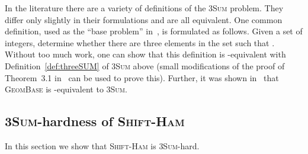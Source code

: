 \documentclass[11pt]{article}
\newcommand{\sHam}{\textsc{Shift-Ham}\xspace}
\newcommand{\threeSUM}{\textsc{3Sum}\xspace}
\newcommand{\geombase}{\textsc{GeomBase}\xspace}
\theoremstyle{plain}
\theoremstyle{definition}
\begin{document}
In the literature there are a variety of definitions of the \threeSUM problem. They differ only slightly in their formulations and are all equivalent. One common definition, used as the ``base problem'' in~\cite{GO:1995}, is formulated as follows. Given a set of  integers, determine whether there are three elements  in the set such that . Without too much work, one can show that this definition is -equivalent with Definition~\ref{def:threeSUM} of \threeSUM above (small modifications of the proof of Theorem~3.1 in~\cite{GO:1995} can be used to prove this). Further, it was shown in~\cite{GO:1995} that \geombase is -equivalent to \threeSUM.


\subsection{\threeSUM-hardness of \sHam}

In this section we show that \sHam is \threeSUM-hard.
\end{document}

